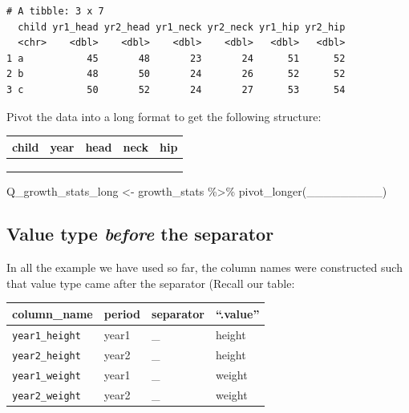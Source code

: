 \documentclass[
  letterpaper,
  DIV=11,
  numbers=noendperiod]{scrreprt}
\newenvironment{Shaded}{\begin{snugshade}}{\end{snugshade}}
\newcommand{\FunctionTok}[1]{\textcolor[rgb]{0.28,0.35,0.67}{#1}}
\newcommand{\NormalTok}[1]{\textcolor[rgb]{0.00,0.23,0.31}{#1}}
\newcommand{\OtherTok}[1]{\textcolor[rgb]{0.00,0.23,0.31}{#1}}
\newcommand{\SpecialCharTok}[1]{\textcolor[rgb]{0.37,0.37,0.37}{#1}}
\begin{document}
\begin{tcolorbox}
\begin{verbatim}
# A tibble: 3 x 7
  child yr1_head yr2_head yr1_neck yr2_neck yr1_hip yr2_hip
  <chr>    <dbl>    <dbl>    <dbl>    <dbl>   <dbl>   <dbl>
1 a           45       48       23       24      51      52
2 b           48       50       24       26      52      52
3 c           50       52       24       27      53      54
\end{verbatim}

Pivot the data into a long format to get the following structure:

\begin{longtable}[]{@{}lllll@{}}
\toprule\noalign{}
child & year & head & neck & hip \\
\midrule\noalign{}
\endhead
\bottomrule\noalign{}
\endlastfoot
& & & & \\
& & & & \\
& & & & \\
\end{longtable}

\begin{Shaded}
\begin{Highlighting}[]
\NormalTok{Q\_growth\_stats\_long }\OtherTok{\textless{}{-}}
\NormalTok{  growth\_stats }\SpecialCharTok{\%\textgreater{}\%}
  \FunctionTok{pivot\_longer}\NormalTok{(\_\_\_\_\_\_\_\_\_)}
\end{Highlighting}
\end{Shaded}

\end{tcolorbox}

\subsection{\texorpdfstring{Value type \emph{before} the
separator}{Value type before the separator}}\label{value-type-before-the-separator}

In all the example we have used so far, the column names were
constructed such that value type came after the separator (Recall our
table:

\begin{longtable}[]{@{}llll@{}}
\toprule\noalign{}
column\_name & period & separator & ``.value'' \\
\midrule\noalign{}
\endhead
\bottomrule\noalign{}
\endlastfoot
\texttt{year1\_height} & year1 & \_ & height \\
\texttt{year2\_height} & year2 & \_ & height \\
\texttt{year1\_weight} & year1 & \_ & weight \\
\texttt{year2\_weight} & year2 & \_ & weight \\
\end{longtable}
\end{document}
